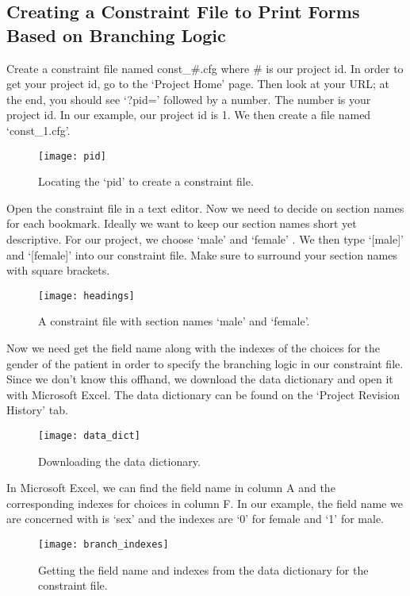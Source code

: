 \documentclass[12pt]{article}
\begin{document}
    \subsection{Creating a Constraint File to Print Forms Based on Branching Logic}
    	Create a constraint file named const\_\#.cfg where \# is our project id. In order to get your project id, go to the `Project Home' page. Then look at your URL; at the end, you should see `?pid=' followed by a number. The number is your project id. In our example, our project id is 1. We then create a file named `const\_1.cfg'.
	\begin{figure}[H]
            \centering
            \texttt{[image: pid]}
            \caption{Locating the `pid' to create a constraint file.}
        \end{figure}
	\newpage
	Open the constraint file in a text editor. Now we need to decide on section names for each bookmark. Ideally we want to keep our section names short yet descriptive. For our project, we choose `male' and `female' . We then type `[male]' and `[female]' into our constraint file. Make sure to surround your section names with square brackets.
        \begin{figure}[H]
            \centering
            \texttt{[image: headings]}
	    \caption{A constraint file with section names `male' and `female'.}
        \end{figure}
	Now we need get the field name along with the indexes of the choices for the gender of the patient in order to specify the branching logic in our constraint file. Since we don't know this offhand, we download the data dictionary and open it with Microsoft Excel. The data dictionary can be found on the `Project Revision History' tab.
	\begin{figure}[H]
            \centering
            \texttt{[image: data\_dict]}
            \caption{Downloading the data dictionary.}
        \end{figure}
	\newpage
	In Microsoft Excel, we can find the field name in column A and the corresponding indexes for choices in column F. In our example, the field name we are concerned with is `sex' and the indexes are `0' for female and `1' for male.
	\begin{figure}[H]
            \centering
            \texttt{[image: branch\_indexes]}
	    \caption{Getting the field name and indexes from the data dictionary for the constraint file.}         
\end{figure}
\end{document}
